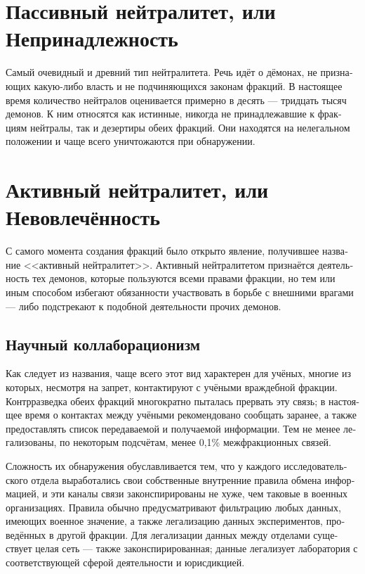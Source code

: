 \documentclass[a4paper,12pt,fleqn]{book}\usepackage{polyglossia}\setdefaultlanguage[babelshorthands=true]{russian}\setotherlanguage{english}\defaultfontfeatures{Ligatures=TeX,Mapping=tex-text}\usepackage{xcolor}\newcommand{\ml}[3]{#2}
\begin{document}
{\section{Пассивный нейтралитет, или Непринадлежность}

Самый очевидный и древний тип нейтралитета.
Речь идёт о дёмонах, не признающих какую-либо власть и не подчиняющихся законам фракций.
В настоящее время количество нейтралов оценивается примерно в десять --- тридцать тысяч демонов.
К ним относятся как истинные, никогда не принадлежавшие к фракциям нейтралы, так и дезертиры обеих фракций.
\ml{$0$}
{Они находятся на нелегальном положении и чаще всего уничтожаются при обнаружении.}
{They have an illegal status and mostly are killed on sight.}

\section{Активный нейтралитет, или Невовлечённость}

С самого момента создания фракций было открыто явление, получившее название <<активный нейтралитет>>.
Активный нейтралитетом признаётся деятельность тех демонов, которые пользуются всеми правами фракции, но тем или иным способом избегают обязанности участвовать в борьбе с внешними врагами --- либо подстрекают к подобной деятельности прочих демонов.

\subsection{Научный коллаборационизм}

Как следует из названия, чаще всего этот вид характерен для учёных, многие из которых, несмотря на запрет, контактируют с учёными враждебной фракции.
Контрразведка обеих фракций многократно пыталась прервать эту связь;
в настоящее время о контактах между учёными рекомендовано сообщать заранее, а также предоставлять список передаваемой и получаемой информации.
Тем не менее легализованы, по некоторым подсчётам, менее 0,1\% межфракционных связей.

Сложность их обнаружения обуславливается тем, что у каждого исследовательского отдела выработались свои собственные внутренние правила обмена информацией, и эти каналы связи законспирированы не хуже, чем таковые в военных организациях.
Правила обычно предусматривают фильтрацию любых данных, имеющих военное значение, а также легализацию данных экспериментов, проведённых в другой фракции.
Для легализации данных между отделами существует целая сеть --- также законспирированная;
данные легализует лаборатория с соответствующей сферой деятельности и юрисдикцией.

}
\end{document}
